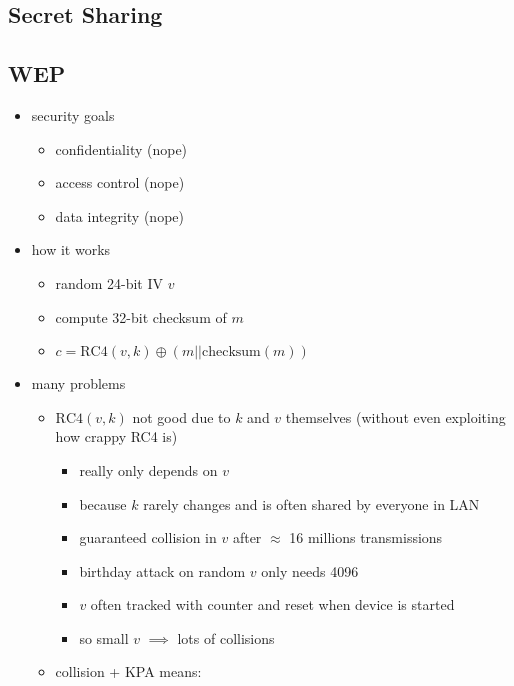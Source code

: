 \documentclass[12pt]{article}
\providecommand{\tightlist}{%
  \setlength{\itemsep}{0pt}\setlength{\parskip}{0pt}}
\begin{document}
\hypertarget{secret-sharing}{%
\subsection{Secret Sharing}\label{secret-sharing}}

\hypertarget{wep}{%
\subsection{WEP}\label{wep}}

\begin{itemize}
\tightlist
\item
  security goals

  \begin{itemize}
  \tightlist
  \item
    confidentiality (nope)
  \item
    access control (nope)
  \item
    data integrity (nope)
  \end{itemize}
\item
  how it works

  \begin{itemize}
  \tightlist
  \item
    random 24-bit IV \(v\)
  \item
    compute 32-bit checksum of \(m\)
  \item
    \(c = \text{RC4}(v, k) \oplus (m || \text{checksum}(m))\)
  \end{itemize}
\item
  many problems

  \begin{itemize}
  \tightlist
  \item
    \(\text{RC4}(v, k)\) not good due to \(k\) and \(v\) themselves
    (without even exploiting how crappy RC4 is)

    \begin{itemize}
    \tightlist
    \item
      really only depends on \(v\)
    \item
      because \(k\) rarely changes and is often shared by everyone in
      LAN
    \item
      guaranteed collision in \(v\) after \(\approx\) 16 millions
      transmissions
    \item
      birthday attack on random \(v\) only needs 4096
    \item
      \(v\) often tracked with counter and reset when device is started
    \item
      so small \(v\) \(\implies\) lots of collisions
    \end{itemize}
  \item
    collision + KPA means:


\end{itemize}
\end{itemize}
\end{document}
